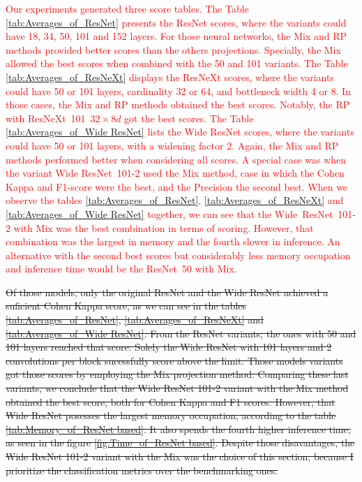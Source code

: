 \textcolor{red}{
Our experiments generated three score tables. 
The Table \ref{tab:Averages_of_ResNet} presents the ResNet scores, where the variants could have 18, 34, 50, 101 and 152 layers. For those neural networks, the \gls{Mix} and \gls{RP} methods provided better scores than the others projections. Specially, the \gls{Mix} allowed the best scores when combined with the 50 and 101 variants.
The Table \ref{tab:Averages_of_ResNeXt} displays the ResNeXt scores, where the variants could have 50 or 101 layers, cardinality 32 or 64, and bottleneck width 4 or 8. In those cases, the \gls{Mix} and \gls{RP} methods obtained the best scores. Notably, the \gls{RP} with \mbox{ResNeXt 101 $32\times 8d$} got the best scores. 
The Table \ref{tab:Averages_of_Wide ResNet} lists the Wide ResNet scores, where the variants could have 50 or 101 layers, with a widening factor 2. Again, the \gls{Mix} and \gls{RP} methods performed better when considering all scores. A special case was when the variant Wide \mbox{ResNet 101-2} used the \gls{Mix} method, case in which the Cohen Kappa and F1-score were the best, and the Precision the second best.    
When we observe the tables \ref{tab:Averages_of_ResNet}, \ref{tab:Averages_of_ResNeXt} and \ref{tab:Averages_of_Wide ResNet} together, we can see that the \mbox{Wide ResNet 101-2} with \gls{Mix} was the best combination in terms of scoring. However, that combination was the largest in memory and the fourth slower in inference. An alternative with the second best scores but considerably less memory occupation and inference time would be the \mbox{ResNet 50} with \gls{Mix}. 
}

\sout{
Of those models, only the original ResNet and the Wide ResNet achieved a suficient Cohen Kappa score, as we can see in the tables \ref{tab:Averages_of_ResNet}, \ref{tab:Averages_of_ResNeXt} and \ref{tab:Averages_of_Wide ResNet}. From the ResNet variants, the ones with 50 and 101 layers reached that score. Solely the Wide ResNet with 101 layers and 2 convolutions per block sucessfully score above the limit. Those models variants got those scores by employing the \gls{Mix} projection method. Comparing these last variants, we conclude that the Wide ResNet 101-2 variant with the \gls{Mix} method obtained the best score, both for Cohen Kappa and F1 scores. However, that Wide ResNet posesses the largest memory occupation, according to the table \ref{tab:Memory_of_ResNet based}. It also spends the fourth higher inference time, as seen in the figure \ref{fig:Time_of_ResNet based}. Despite those disavantages, the Wide ResNet 101-2 variant with the \gls{Mix} was the choice of this section, because I prioritize the classification metrics over the benchmarking ones.
}

